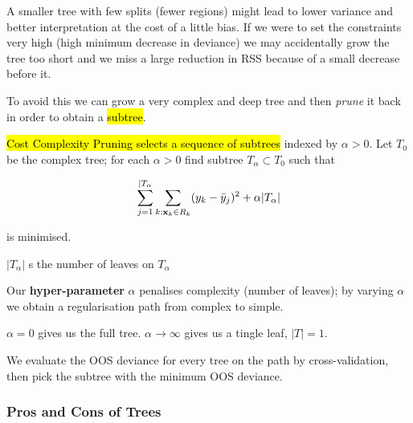 \documentclass[11pt]{article}
\begin{document}
A smaller tree with few splits (fewer regions) might lead to lower variance and better interpretation at the cost of a little bias. If we were to set the constraints very high (high minimum decrease in deviance) we may accidentally grow the tree too short and we miss a large reduction in RSS because of a small decrease before it. 

To avoid this we can grow a very complex and deep tree and then \textit{prune} it back in order to obtain a \hl{subtree}.

\begin{definition}
    \hl{Cost Complexity Pruning selects a sequence of subtrees} indexed by $\alpha>0$. Let $T_0$ be the complex tree; for each $\alpha>0$ find subtree $T_\alpha\subset T_0$ such that

    \begin{equation}
        \sum_{j=1}^{|T_\alpha}\sum_{k:\mathbf{x}_k\in R_k}(y_k - \Bar{y}_j)^2 + \alpha|T_\alpha|
    \end{equation}

    is minimised.

    \begin{note}
        $|T_\alpha|$ s the number of leaves on $T_\alpha$
    \end{note}

    Our \textbf{hyper-parameter} $\alpha$ penalises complexity (number of leaves); by varying $\alpha$ we obtain a regularisation path from complex to simple.

    \begin{note}
        $\alpha=0$ gives us the full tree. $\alpha\rightarrow\infty$ gives us a tingle leaf, $|T| = 1$.
    \end{note}

    We evaluate the OOS deviance for every tree on the path by cross-validation, then pick the subtree with the minimum OOS deviance.
\end{definition}



\subsubsection{Pros and Cons of Trees}
\end{document}
